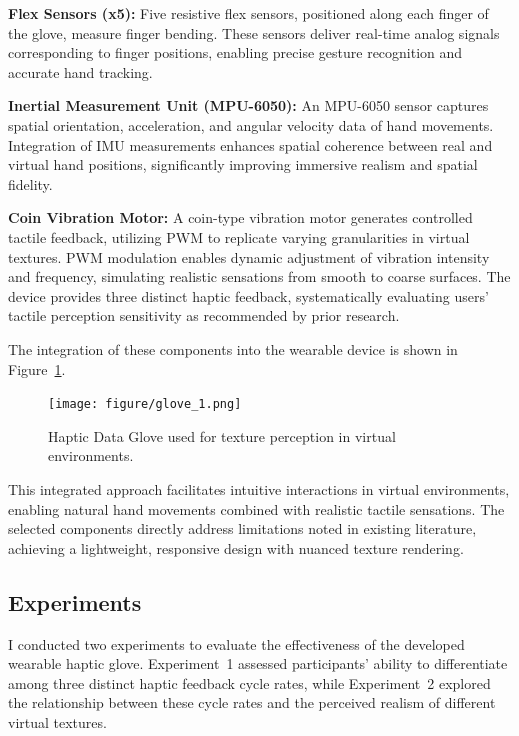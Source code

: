 \documentclass[graybox]{svmult}
\begin{document}
\textbf{Flex Sensors (x5):}
Five resistive flex sensors, positioned along each finger of the glove, measure finger bending. These sensors deliver real-time analog signals corresponding to finger positions, enabling precise gesture recognition and accurate hand tracking.

\textbf{Inertial Measurement Unit (MPU-6050):}
An MPU-6050 sensor captures spatial orientation, acceleration, and angular velocity data of hand movements. Integration of IMU measurements enhances spatial coherence between real and virtual hand positions, significantly improving immersive realism and spatial fidelity.

\textbf{Coin Vibration Motor:}
A coin-type vibration motor generates controlled tactile feedback, utilizing PWM to replicate varying granularities in virtual textures. PWM modulation enables dynamic adjustment of vibration intensity and frequency, simulating realistic sensations from smooth to coarse surfaces. The device provides three distinct haptic feedback, systematically evaluating users' tactile perception sensitivity as recommended by prior research.

The integration of these components into the wearable device is shown in Figure~\ref{fig:glove_1}.

\begin{figure}\centering
	\texttt{[image: figure/glove\_1.png]}%
	\caption{Haptic Data Glove used for texture perception in virtual environments.}\label{fig:glove_1}
\end{figure}

This integrated approach facilitates intuitive interactions in virtual environments, enabling natural hand movements combined with realistic tactile sensations. The selected components directly address limitations noted in existing literature, achieving a lightweight, responsive design with nuanced texture rendering.

\subsection{Experiments}\label{sec:Experiments}
I conducted two experiments to evaluate the effectiveness of the developed wearable haptic glove. Experiment~1 assessed participants' ability to differentiate among three distinct haptic feedback cycle rates, while Experiment~2 explored the relationship between these cycle rates and the perceived realism of different virtual textures.
\end{document}
